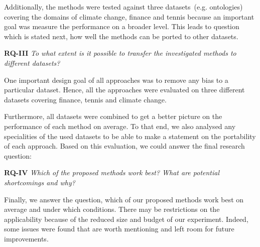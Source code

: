 Additionally, the methods were tested against three datasets~(e.g. ontologies) covering the domains of climate change, finance and tennis because an important goal was measure the performance on a broader level. This leads to question which is stated next, how well the methods can be ported to other datasets. 
 
\textbf{RQ-III} \emph{To what extent is it possible to transfer the investigated methods to different datasets?}

One important design goal of all approaches was to remove any bias to a particular dataset. Hence, all the approaches were evaluated on three different datasets covering finance, tennis and climate change. 

Furthermore, all datasets were combined to get a better picture on the performance of each method on average. To that end, we also analysed any specialities of the used datasets to be able to make a statement on the portability of each approach. Based on this evaluation, we could answer the final research question:

\textbf{RQ-IV} \emph{Which of the proposed methods work best? What are potential shortcomings and why?}

Finally, we answer the question, which of our proposed methods work best on average and under which conditions. There may be restrictions on the applicability because of the reduced size and budget of our experiment. Indeed, some issues were found that are worth mentioning and left room for future improvements. 



